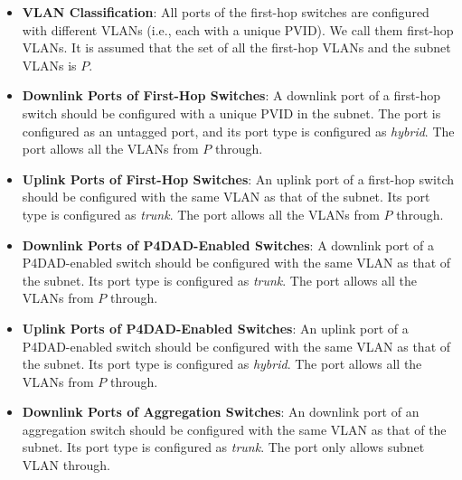 \documentclass[journal]{IEEEtran}
\begin{document}
            \begin{itemize}
                \item \textbf{VLAN Classification}: All ports of the first-hop switches are configured with different VLANs (i.e., each with a unique PVID). We call them first-hop VLANs. It is assumed that the set of all the first-hop VLANs and the subnet VLANs is $P$.

                \item \textbf{Downlink Ports of First-Hop Switches}: A downlink port of a first-hop switch should be configured with a unique PVID in the subnet. The port is configured as an untagged port, and its port type is configured as \emph{hybrid}. The port allows all the VLANs from $P$ through.

                \item \textbf{Uplink Ports of First-Hop Switches}: An uplink port of a first-hop switch should be configured with the same VLAN as that of the subnet. Its port type is configured as \emph{trunk}. The port allows all the VLANs from $P$ through.

                \item \textbf{Downlink Ports of P4DAD-Enabled Switches}: A downlink port of a P4DAD-enabled switch should be configured with the same VLAN as that of the subnet. Its port type is configured as \emph{trunk}. The port allows all the VLANs from $P$ through.

                \item \textbf{Uplink Ports of P4DAD-Enabled Switches}: An uplink port of a P4DAD-enabled switch should be configured with the same VLAN as that of the subnet. Its port type is configured as \emph{hybrid}. The port allows all the VLANs from $P$ through.

                \item \textbf{Downlink Ports of Aggregation Switches}: An downlink port of an aggregation switch should be configured with the same VLAN as that of the subnet. Its port type is configured as \emph{trunk}. The port only allows subnet VLAN through.
            \end{itemize}
            
\end{document}
